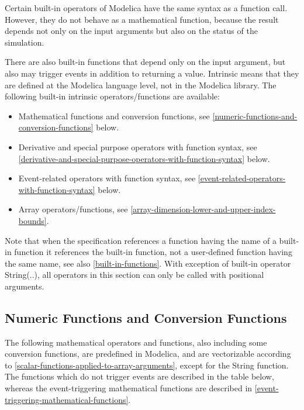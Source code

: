 Certain built-in operators of Modelica have the same syntax as a
function call. However, they do not behave as a mathematical function,
because the result depends not only on the input arguments but also on
the status of the simulation.

There are also built-in functions that depend only on the input
argument, but also may trigger events in addition to returning a value.
Intrinsic means that they are defined at the Modelica language level,
not in the Modelica library. The following built-in intrinsic
operators/functions are available:

\begin{itemize}
\item
  Mathematical functions and conversion functions, see \autoref{numeric-functions-and-conversion-functions}
  below.
\item
  Derivative and special purpose operators with function syntax, see
  \autoref{derivative-and-special-purpose-operators-with-function-syntax} below.
\item
  Event-related operators with function syntax, see \autoref{event-related-operators-with-function-syntax} below.
\item
  Array operators/functions, see \autoref{array-dimension-lower-and-upper-index-bounds}.
\end{itemize}

Note that when the specification references a function having the name
of a built-in function it references the built-in function, not a
user-defined function having the same name, see also \autoref{built-in-functions}. With
exception of built-in operator String(..), all operators in this section
can only be called with positional arguments.

\subsection{Numeric Functions and Conversion Functions}

The following mathematical operators and functions, also including some
conversion functions, are predefined in Modelica, and are vectorizable
according to \autoref{scalar-functions-applied-to-array-arguments}, except for the String function. The
functions which do not trigger events are described in the table below,
whereas the event-triggering mathematical functions are described in
\autoref{event-triggering-mathematical-functions}.

